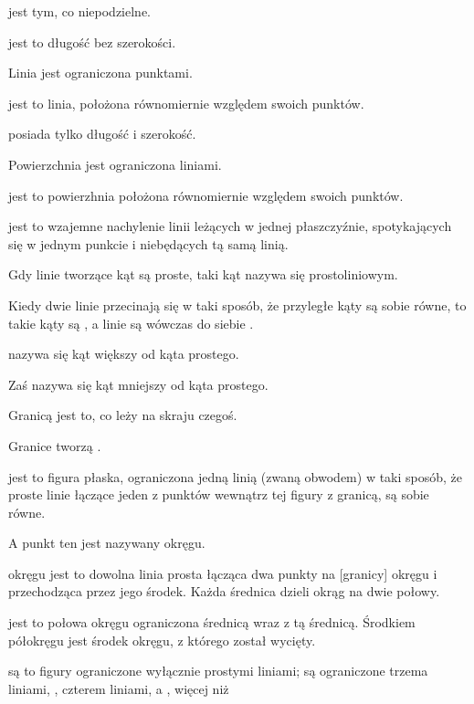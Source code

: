 \item {} jest tym, co niepodzielne.
\item {} jest to długość bez szerokości.
\item Linia jest ograniczona punktami.
\item {} jest to linia, położona równomiernie względem swoich
    punktów.
\item {} posiada tylko długość i szerokość.
\item Powierzchnia jest ograniczona liniami.
\item {} jest to powierzhnia położona równomiernie względem
    swoich punktów.
\item {} jest to wzajemne nachylenie linii leżących w jednej
    płaszczyźnie, spotykających się w jednym punkcie i niebędących tą samą
    linią.
\item Gdy linie tworzące kąt są proste, taki kąt nazywa się prostoliniowym.
\item Kiedy dwie linie przecinają się w taki sposób, że przyległe kąty są
    sobie równe, to takie kąty są , a linie są wówczas
    do siebie .
\item {} nazywa się kąt większy od kąta prostego.
\item Zaś  nazywa się kąt mniejszy od kąta prostego.
\item Granicą jest to, co leży na skraju czegoś.
\item Granice tworzą .
\item {} jest to figura płaska, ograniczona jedną linią (zwaną
    obwodem) w taki sposób, że proste linie łączące jeden z punktów wewnątrz
    tej figury z granicą, są sobie równe.
\item A punkt ten jest nazywany  okręgu.
\item {} okręgu jest to dowolna linia prosta łącząca dwa punkty
    na [granicy] okręgu i przechodząca przez jego środek. Każda średnica
    dzieli okrąg na dwie połowy.
\item {} jest to połowa okręgu ograniczona średnicą wraz z tą
    średnicą. Środkiem półokręgu jest środek okręgu, z którego został
    wycięty.
\item {} są to figury ograniczone wyłącznie
    prostymi liniami;  są ograniczone trzema liniami,
    , czterem liniami, a , więcej niż
